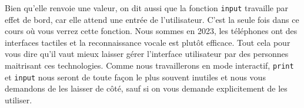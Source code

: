 \documentclass{magnolia}
\begin{document}
\noindent Bien qu'elle renvoie une valeur, on dit aussi que la fonction \verb_input_
travaille par effet de bord, car elle attend une entrée de l'utilisateur.
C'est la seule fois dans ce cours où vous verrez cette fonction. Nous sommes en
2023, les téléphones ont des interfaces tactiles et la reconnaissance vocale est
plutôt efficace. Tout cela pour vous dire qu'il vaut mieux laisser gérer l'interface utilisateur
par des personnes maitrisant ces technologies. Comme nous travaillerons en mode
interactif, \verb_print_ et \verb_input_ nous seront de toute façon le plus souvent inutiles et nous vous
demandons de les laisser de côté, sauf si on vous demande explicitement de les utiliser.











\end{document}

